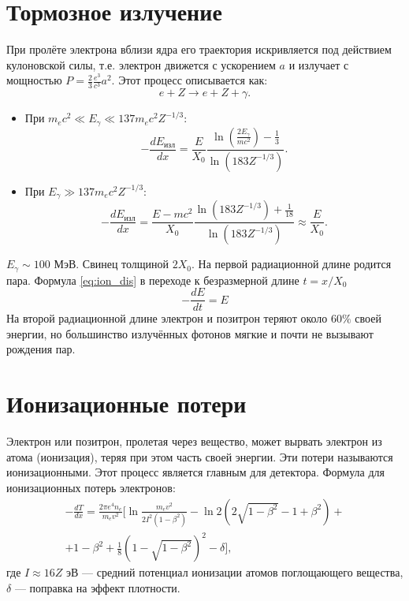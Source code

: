 \documentclass[14pt, a4paper]{extreport}
\begin{document}
\section{Тормозное излучение}
При пролёте электрона вблизи ядра его траектория искривляется под действием кулоновской силы, т.е. электрон движется с ускорением $a$ и излучает с мощностью $P = \frac{2}{3}\frac{e^3}{c^3}a^2$. Этот процесс описывается как:
\begin{equation}
    e + Z \rightarrow e + Z + \gamma.
\end{equation}
\begin{itemize}
    \item При $m_ec^2 \ll E_{\gamma} \ll 137 m_ec^2 Z^{-1/3}$:
    \begin{equation}
        -\frac{dE_{\text{изл}}}{dx} = \frac{E}{X_0}\frac{\ln\left( \frac{2E_{\gamma}}{mc^2} \right) - \frac{1}{3}}{\ln\left(183 Z^{-1/3} \right)}.
    \end{equation}
    \item При $E_{\gamma} \gg 137 m_ec^2 Z^{-1/3}$:
    \begin{equation}
    \label{eq:ion_dis}
        -\frac{dE_{\text{изл}}}{dx} = \frac{E - mc^2}{X_0}\frac{\ln\left(183 Z^{-1/3} \right) + \frac{1}{18}}{\ln\left(183 Z^{-1/3} \right)} \approx \frac{E}{X_0}.
    \end{equation}
\end{itemize}
 $E_{\gamma} \sim 100$ МэВ. Свинец толщиной $2X_0$. На первой радиационной длине родится пара. Формула \ref{eq:ion_dis} в переходе к безразмерной длине $t=x/X_0$
 \begin{equation}
     -\dfrac{dE}{dt} = E
 \end{equation}
На второй радиационной длине электрон и позитрон теряют около 60$\%$ своей энергии, но большинство излучённых фотонов мягкие и почти не вызывают рождения пар.
\section{Ионизационные потери}
Электрон или позитрон, пролетая через вещество, может вырвать электрон из атома (ионизация), теряя при этом часть своей энергии. Эти потери называются ионизационными. Этот процесс является главным для детектора. 
Формула для ионизационных потерь электронов:
\begin{equation}
\begin{aligned}
     -\frac{dT}{dx} = \frac{2\pi e^4 n_e}{m_e v^2} \biggl[ \ln \frac{m_e v^2}{2I^2(1-\beta^2)} - \ln 2\left(2\sqrt{1-\beta^2} - 1 + \beta^2\right) + \\
      + 1 - \beta^2 + \frac{1}{8}\left(1 - \sqrt{1-\beta^2}\right)^2 - \delta \biggr],
\end{aligned}
\end{equation}
где $I \approx 16Z$ эВ — средний потенциал ионизации атомов поглощающего вещества, $\delta$ — поправка на эффект плотности.
\end{document}

